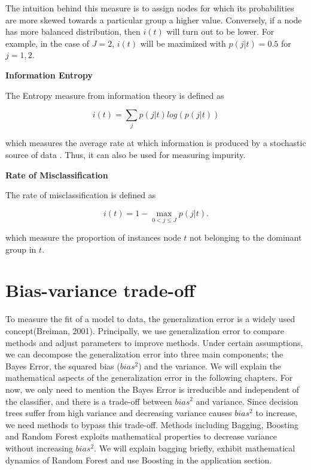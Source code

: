 The intuition behind this measure is to assign nodes for which its probabilities are more skewed towards a particular group a higher value.
Conversely, if a node has more balanced distribution, then \(i(t)\) will turn out to be lower.
For example, in the case of \( J=2 \), \(i(t)\) will be maximized with \( p(j|t) = 0.5 \) for \(j = 1, 2\).


\textbf{Information Entropy}

The Entropy measure from information theory is defined as

\begin{equation}
    i(t) = \sum_{j} p(j|t) log(p(j|t))
\end{equation}

which measures the average rate at which information is produced by a stochastic source of data .
Thus, it can also be used for measuring impurity.

\newpage

\textbf{Rate of Misclassification}

The rate of misclassification is defined as 

\begin{equation}
    i(t) = 1 - \max_{0 < j \leq J} p(j|t) .
\end{equation}

which measure the proportion of instances node \(t\) not belonging to the dominant group in \(t\).


\section{Bias-variance trade-off}
To measure the fit of a model to data, the generalization error is a widely used concept(Breiman, 2001). Principally, we use generalization error to compare methods and adjust parameters to improve methods. Under certain assumptions, we can decompose the generalization error into three main components; the Bayes Error, the squared bias ($bias^2$) and the variance. We will explain the mathematical aspects of the generalization error in the following chapters. For now, we only need to mention the Bayes Error is irreducible and independent of the classifier, and there is a trade-off between $bias^2$ and variance. Since decision trees suffer from high variance and decreasing variance causes $bias^2$ to increase, we need methods to bypass this trade-off. Methods including Bagging, Boosting and Random Forest exploits mathematical properties to decrease variance without increasing $bias^2$. We will explain bagging briefly, exhibit mathematical dynamics of Random Forest and use Boosting in the application section.


